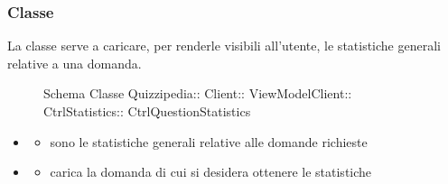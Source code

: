 \subsubsection{Classe }
La classe serve a caricare, per renderle visibili all'utente, le statistiche generali relative a una domanda.
\begin{figure}[H]
\centering
\noindent{}
\caption[Schema Classe CtrlQuestionStatistics]{Schema Classe Quizzipedia:: Client:: ViewModelClient:: CtrlStatistics:: CtrlQuestionStatistics}
\end{figure}
\begin{itemize}
\item {}
\begin{itemize}
\item {}
\newline
sono le statistiche generali relative alle domande richieste
\end{itemize}
\item {}
\begin{itemize}
\item {}
\newline
carica la domanda di cui si desidera ottenere le statistiche
\newline
\end{itemize}
\end{itemize}
